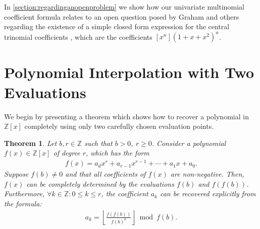 \documentclass{article}
\theoremstyle{plain}
\newtheorem{theorem}{Theorem}
\theoremstyle{definition}
\newcommand{\floor}[1]{\left\lfloor #1 \right\rfloor}
\begin{document}
In \cref{section:regardinganopenproblem} we show how our univariate multinomial coefficient formula relates to an open question posed by Graham and others regarding the existence of a simple closed form expression for the central trinomial coefficients \cite{graham1994concrete}, which are the coefficients $[x^n](1+x+x^2)^n$.

\section{Polynomial Interpolation with Two Evaluations}
We begin by presenting a theorem which shows how to recover a polynomial in $\mathbb{Z}[x]$ completely using only two carefully chosen evaluation points.

\begin{theorem} \label{theorem:encoding}
Let $b, r \in \mathbb{Z}$ such that $b > 0$, $r \geq 0$. Consider a polynomial $f(x) \in \mathbb{Z}[x]$ of degree $r$, which has the form
\begin{align*}
    f(x) = a_d x^r + a_{r-1} x^{r-1} + \cdots + a_1 x + a_0 .
\end{align*}
Suppose $f(b) \not= 0$ and that all coefficients of $f(x)$ are non-negative. Then, $f(x)$ can be completely determined by the evaluations $f(b)$ and $f(f(b))$. Furthermore, $\forall k \in \mathbb{Z} : 0 \leq k \leq r$, the coefficient $a_k$ can be recovered explicitly from the formula:
\begin{align*}
a_k = \floor{\frac{f(f(b))}{f(b)^{k}}} \bmod{f(b)} .
\end{align*}
\end{theorem}
\end{document}
